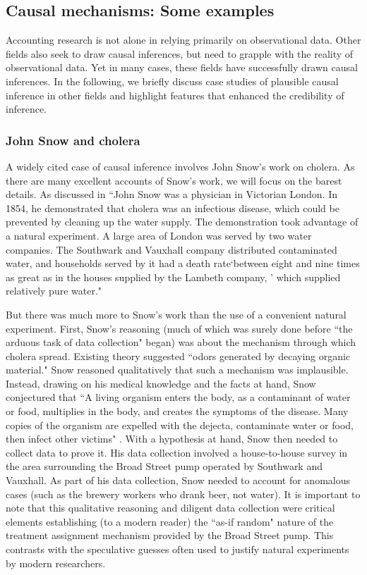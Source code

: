 \documentclass[11pt,reqno]{amsart}
\begin{document}
\begin{doublespace}
\subsection{Causal mechanisms: Some examples}
Accounting research is not alone in relying primarily on observational data.
Other fields also seek to draw causal inferences, but need to grapple with the reality of observational data. 
Yet in many cases, these fields have successfully drawn causal inferences.
In the following, we briefly discuss case studies of plausible causal inference in other fields and highlight features that enhanced the credibility of inference.

\subsubsection{John Snow and cholera}
A widely cited case of causal inference involves John Snow's work on cholera.
As there are many excellent accounts of Snow's work, we will focus on the barest details.
As discussed in  \citet[p.\,339]{Freedman:2009ur}
``John Snow was a physician in Victorian London.
 In 1854, he demonstrated that cholera was an infectious disease, which could be prevented by cleaning up the water supply. 
The demonstration took advantage of a natural experiment.
 A large area of London was served by two water companies. 
 The Southwark and Vauxhall company distributed contaminated water, and households served by it had a death rate`between eight and nine times as great as in the houses supplied by the Lambeth company, ' which supplied relatively pure water."

But there was much more to Snow's work than the use of a convenient natural experiment.
First, Snow's reasoning (much of which was surely done before ``the arduous task of data collection" began) was about the  mechanism through which cholera spread. Existing theory suggested ``odors generated by decaying organic material."
Snow reasoned qualitatively that such a mechanism was implausible.
Instead, drawing on his medical knowledge and the facts at hand, Snow conjectured that ``A living organism enters the body, as a contaminant of water or food, multiplies in the body, and creates the symptoms of the disease. Many copies of the organism are expelled with the dejecta, contaminate water or food, then infect other victims" \citep[p.\,342]{Freedman:2009ur}.
With a hypothesis at hand, Snow then needed to collect data to prove it.
His data collection involved a house-to-house survey in the area surrounding the Broad Street pump operated by  Southwark and Vauxhall.
As part of his data collection, Snow needed to account for anomalous cases (such as the brewery workers who drank beer, not water).
It is important to note that this qualitative reasoning and diligent data collection were critical elements establishing (to a modern reader) the ``as-if random" nature of the treatment assignment mechanism provided by the Broad Street pump.
This contrasts with the speculative guesses often used to justify natural experiments by modern researchers.


\end{doublespace}
\end{document}
